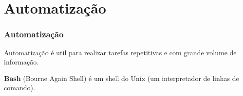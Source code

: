 \section{Automatização}
\begin{frame}
\frametitle{Automatização}
Automatização é util para realizar tarefas repetitivas e com grande volume de informação.

\vspace{3ex}
\textbf{Bash} (Bourne Again Shell) é um shell do Unix (um interpretador de linhas de comando).

\vspace{3ex}
\end{frame}
